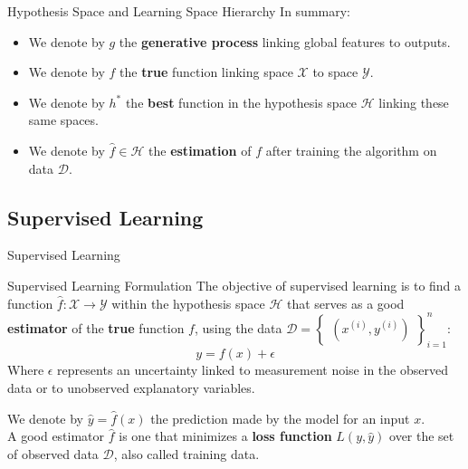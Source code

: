 \begin{frame}{Hypothesis Space and Learning Space Hierarchy}
	In summary:
	\begin{itemize}
		\item We denote by $g$ the \textbf{generative process} linking global features to outputs.
		\item We denote by $f$ the \textbf{true} function linking space $\mathcal{X}$ to space $\mathcal{Y}$.
		\item We denote by $h^*$ the \textbf{best} function in the hypothesis space $\mathcal{H}$ linking these same spaces.
		\item We denote by $\hat{f} \in \mathcal{H}$ the \textbf{estimation} of $f$ after training the algorithm on data $\mathcal{D}$.
	\end{itemize}
\end{frame}

\subsection[Supervised Learning]{Supervised Learning}

\begin{frame}{Supervised Learning}
	\begin{block}{Supervised Learning Formulation}
		The objective of supervised learning is to find a function $\hat{f}: \mathcal{X} \to \mathcal{Y}$ within the hypothesis space $\mathcal{H}$ that serves as a good \textbf{estimator} of the \textbf{true} function $f$, using the data $\mathcal{D} = \begin{Bmatrix}(x^{(i)}, y^{(i)})\end{Bmatrix}_{i=1}^n$:
		\begin{equation*}
			y = f(x) + \epsilon
		\end{equation*}
		Where $\epsilon$ represents an uncertainty linked to measurement noise in the observed data or to unobserved explanatory variables.
		\hfill
	\end{block}
	\vspace{0.5cm}
	\pause
	We denote by $\hat{y} = \hat{f}(x)$ the prediction made by the model for an input $x$. \\
	\vspace{0.5cm}
	\pause
	A good estimator $\hat{f}$ is one that minimizes a \textbf{loss function} $L(y, \hat{y})$ over the set of observed data $\mathcal{D}$, also called training data.
\end{frame}

